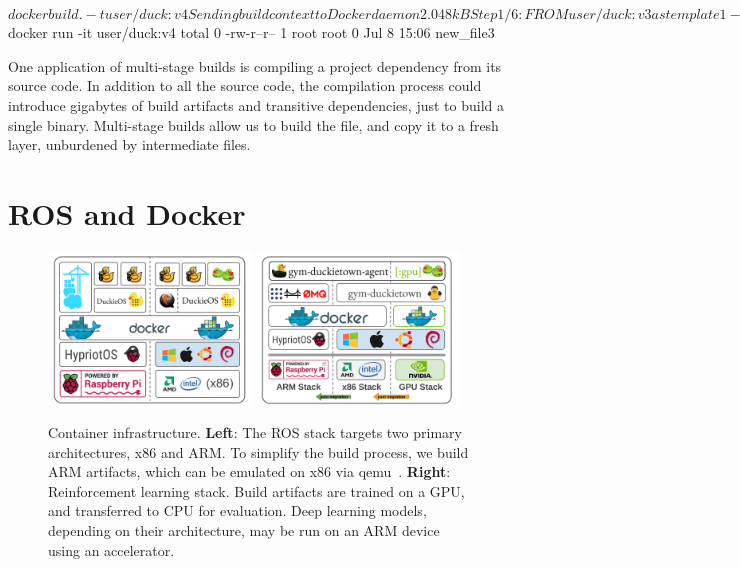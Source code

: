 \documentclass[12pt,initial,twoside,maitrise]{dms}
\numberwithin{equation}{section}
\numberwithin{table}{chapter}
\numberwithin{figure}{chapter}
\begin{document}
\begin{pclisting}
~$ docker build . -t user/duck:v4
Sending build context to Docker daemon  2.048kB
Step 1/6 : FROM user/duck:v3 as template1
--- e3b75ef8ecc4
Step 2/6 : FROM daphne/duck as template2
--- ea2f90g8de9e
Step 3/6 : COPY --from=template1 new_file1 new_file2
---> 72b96668378e
Step 4/6 : FROM donald/duck:v3 as template3
---> e3b75ef8ecc4
Step 5/6 : COPY --from=template2 new_file2 new_file3
---> cb1b84277228
Step 6/6 : CMD ls
---> Running in cb1b84277228
Removing intermediate container cb1b84277228
---> c7dc5dd63e77
Successfully built c7dc5dd63e77
Successfully tagged user/duck:v4
~$ docker run -it user/duck:v4
total 0
-rw-r--r-- 1 root root 0 Jul  8 15:06 new_file3
\end{pclisting}
%
One application of multi-stage builds is compiling a project dependency from its source code. In addition to all the source code, the compilation process could introduce gigabytes of build artifacts and transitive dependencies, just to build a single binary. Multi-stage builds allow us to build the file, and copy it to a fresh layer, unburdened by intermediate files.

\section{ROS and Docker}\label{sec:ros-docker}

\begin{figure}[ht]
    \centering
    \includegraphics[width=0.48\textwidth]{docker_stack_1.png}
    \includegraphics[width=0.48\textwidth]{docker_stack_2.png}
    \caption{Container infrastructure. \textbf{Left}: The ROS stack targets two primary architectures, x86 and ARM. To simplify the build process, we build ARM artifacts, which can be emulated on x86 via qemu~\citep{bellard2005qemu}. \textbf{Right}: Reinforcement learning stack. Build artifacts are trained on a GPU, and transferred to CPU for evaluation. Deep learning models, depending on their architecture, may be run on an ARM device using an accelerator.}
    \label{fig:docker}
\end{figure}
\end{document}
